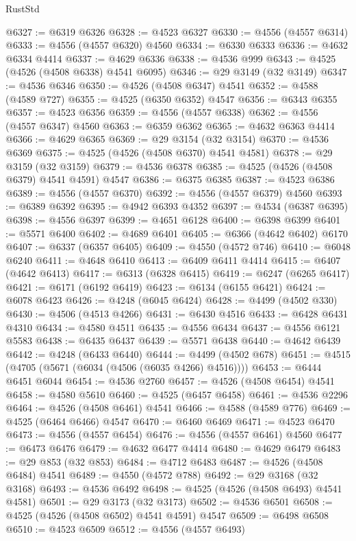 \begin{lexlean}{RustStd}
\begin{coremodule}
{\begin{coremodule}
{{{{{{{{{{{{{{{{{{{{{{{{{{{{{{{{{{{{{{{{{{{{{{{{{{{{{{{@6327 := @6319 @6326
@6328 := @4523 @6327
@6330 := @4556 (@4557 @6314)
@6333 := @4556 (@4557 @6320) @4560
@6334 := @6330 @6333
@6336 := @4632 @6334 @4414
@6337 := @4629 @6336
@6338 := @4536 @999
@6343 := @4525 (@4526 (@4508 @6338) @4541 @6095)
@6346 := @29 @3149 (@32 @3149)
@6347 := @4536 @6346
@6350 := @4526 (@4508 @6347) @4541
@6352 := @4588 (@4589 @727)
@6355 := @4525 (@6350 @6352) @4547
@6356 := @6343 @6355
@6357 := @4523 @6356
@6359 := @4556 (@4557 @6338)
@6362 := @4556 (@4557 @6347) @4560
@6363 := @6359 @6362
@6365 := @4632 @6363 @4414
@6366 := @4629 @6365
@6369 := @29 @3154 (@32 @3154)
@6370 := @4536 @6369
@6375 := @4525 (@4526 (@4508 @6370) @4541 @4581)
@6378 := @29 @3159 (@32 @3159)
@6379 := @4536 @6378
@6385 := @4525 (@4526 (@4508 @6379) @4541 @4591) @4547
@6386 := @6375 @6385
@6387 := @4523 @6386
@6389 := @4556 (@4557 @6370)
@6392 := @4556 (@4557 @6379) @4560
@6393 := @6389 @6392
@6395 := @4942 @6393 @4352
@6397 := @4534 (@6387 @6395)
@6398 := @4556 @6397
@6399 := @4651 @6128
@6400 := @6398 @6399
@6401 := @5571 @6400
@6402 := @4689 @6401
@6405 := @6366 (@4642 @6402) @6170
@6407 := @6337 (@6357 @6405)
@6409 := @4550 (@4572 @746)
@6410 := @6048 @6240
@6411 := @4648 @6410
@6413 := @6409 @6411 @4414
@6415 := @6407 (@4642 @6413)
@6417 := @6313 (@6328 @6415)
@6419 := @6247 (@6265 @6417)
@6421 := @6171 (@6192 @6419)
@6423 := @6134 (@6155 @6421)
@6424 := @6078 @6423
@6426 := @4248 (@6045 @6424)
@6428 := @4499 (@4502 @330)
@6430 := @4506 (@4513 @4266)
@6431 := @6430 @4516
@6433 := @6428 @6431 @4310
@6434 := @4580 @4511
@6435 := @4556 @6434
@6437 := @4556 @6121 @5583
@6438 := @6435 @6437
@6439 := @5571 @6438
@6440 := @4642 @6439
@6442 := @4248 (@6433 @6440)
@6444 := @4499 (@4502 @678)
@6451 := @4515 (@4705 (@5671 (@6034 (@4506 (@6035 @4266) @4516))))
@6453 := @6444 @6451 @6044
@6454 := @4536 @2760
@6457 := @4526 (@4508 @6454) @4541
@6458 := @4580 @5610
@6460 := @4525 (@6457 @6458)
@6461 := @4536 @2296
@6464 := @4526 (@4508 @6461) @4541
@6466 := @4588 (@4589 @776)
@6469 := @4525 (@6464 @6466) @4547
@6470 := @6460 @6469
@6471 := @4523 @6470
@6473 := @4556 (@4557 @6454)
@6476 := @4556 (@4557 @6461) @4560
@6477 := @6473 @6476
@6479 := @4632 @6477 @4414
@6480 := @4629 @6479
@6483 := @29 @853 (@32 @853)
@6484 := @4712 @6483
@6487 := @4526 (@4508 @6484) @4541
@6489 := @4550 (@4572 @788)
@6492 := @29 @3168 (@32 @3168)
@6493 := @4536 @6492
@6498 := @4525 (@4526 (@4508 @6493) @4541 @4581)
@6501 := @29 @3173 (@32 @3173)
@6502 := @4536 @6501
@6508 := @4525 (@4526 (@4508 @6502) @4541 @4591) @4547
@6509 := @6498 @6508
@6510 := @4523 @6509
@6512 := @4556 (@4557 @6493)
}}}}}}}}}}}}}}}}}}}}}}}}}}}}}}}}}}}}}}}}}}}}}}}}}}}}}}}
\end{coremodule}}
\end{coremodule}
\end{lexlean}
